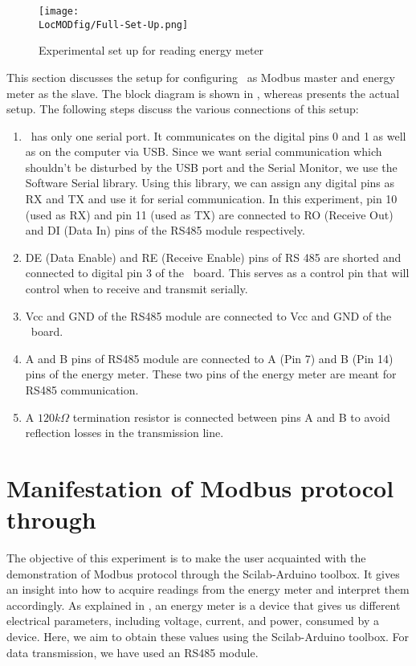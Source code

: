 \begin{figure}
  \centering
  \texttt{[image: \\LocMODfig/Full-Set-Up.png]}
  \caption{Experimental set up for reading energy meter}
  \label{fig:full-set-up}
\end{figure}

This section discusses the setup for configuring 
\arduino\ as Modbus master and energy meter as the slave. 
The block diagram is shown in  , 
whereas  presents the 
actual setup. The following steps discuss the various connections of this setup:  
\begin{enumerate}
  \item \arduino\ has only one serial port. It communicates on
        the digital pins 0 and 1 as well as on the computer via USB. Since
        we want serial communication which shouldn't be disturbed by the USB
        port and the Serial Monitor, we use the Software Serial
        library. Using this library, we can assign any digital pins as RX and
        TX and use it for serial communication. 
        In this experiment, pin 10 (used as RX) and pin 11 (used as TX) are connected to RO (Receive Out) and DI (Data In) pins of the RS485 module respectively.
  \item DE (Data Enable) and RE (Receive Enable) pins of RS 485 are
        shorted and connected to digital pin 3 of the \arduino\ board. 
        This serves as a control pin that will control when to receive and transmit serially.
  \item Vcc and GND of the RS485 module are connected to Vcc and GND of
        the \arduino\ board.
  \item A and B pins of RS485 module are connected to A (Pin 7) and B (Pin 14)
        pins of the energy meter. These two pins of the energy meter are meant for RS485 communication.
  \item A $120k\Omega$ termination resistor is connected between
        pins A and B to avoid reflection losses in the transmission line.
\end{enumerate}




\section{Manifestation of Modbus protocol through \scilab}
The objective of this experiment is to make the user acquainted with
the demonstration of Modbus protocol through the Scilab-Arduino toolbox. 
It gives an insight into how to acquire readings from the energy meter and interpret them accordingly. As explained in , 
an energy meter is a device that gives us different electrical parameters, including voltage, current, and power, consumed by a device. Here, we aim to obtain these values using the Scilab-Arduino toolbox. For data transmission, we have used an RS485 module.

